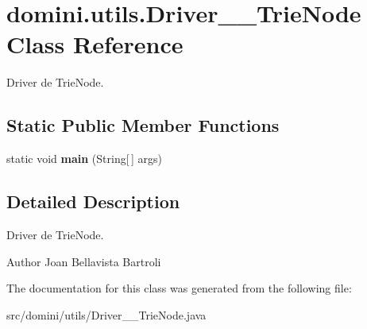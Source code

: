 \hypertarget{classdomini_1_1utils_1_1Driver____TrieNode}{}\section{domini.\+utils.\+Driver\+\_\+\+\_\+\+Trie\+Node Class Reference}
\label{classdomini_1_1utils_1_1Driver____TrieNode}


Driver de Trie\+Node.  


\subsection*{Static Public Member Functions}
\begin{DoxyCompactItemize}
\item 
\mbox{\label{classdomini_1_1utils_1_1Driver____TrieNode_a19cb816408fb6b32cca0ea8ae8bc4153}} 
static void {\bfseries main} (String\mbox{[}$\,$\mbox{]} args)
\end{DoxyCompactItemize}


\subsection{Detailed Description}
Driver de Trie\+Node. 

\begin{DoxyAuthor}{Author}
Joan Bellavista Bartroli 
\end{DoxyAuthor}


The documentation for this class was generated from the following file\+:\begin{DoxyCompactItemize}
\item 
src/domini/utils/Driver\+\_\+\+\_\+\+Trie\+Node.\+java\end{DoxyCompactItemize}
